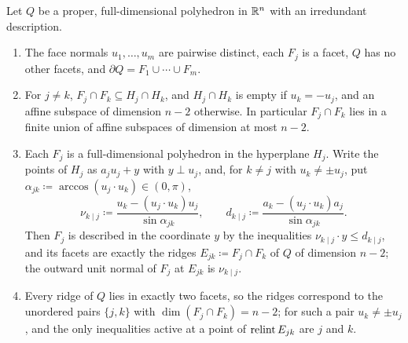 \begin{fact}\label{tb:facets}
Let \(Q\) be a proper, full-dimensional polyhedron in \(\mathbb R^n\) with an
irredundant description.
\begin{enumerate}
\item[(a)] The face normals \(u_1,\ldots,u_m\) are pairwise distinct, each
\(F_j\) is a facet, \(Q\) has no other facets, and
\(\partial Q=F_1\cup\cdots\cup F_m\).
\item[(b)] For \(j\ne k\), \(F_j\cap F_k\subseteq H_j\cap H_k\), and
\(H_j\cap H_k\) is empty if \(u_k=-u_j\), and an affine subspace of
dimension \(n-2\) otherwise. In particular \(F_j\cap F_k\) lies in a
finite union of affine subspaces of dimension at most \(n-2\).
\item[(c)] Each \(F_j\) is a full-dimensional polyhedron in the hyperplane
\(H_j\). Write the points of \(H_j\) as \(a_ju_j+y\) with \(y\perp u_j\), and,
for \(k\ne j\) with \(u_k\ne\pm u_j\), put
\(\alpha_{jk}\coloneqq \arccos(u_j\cdot u_k)\in(0,\pi)\),
\[
 \nu_{k\mid j}\coloneqq \frac{u_k-(u_j\cdot u_k)u_j}{\sin\alpha_{jk}},\qquad
 d_{k\mid j}\coloneqq \frac{a_k-(u_j\cdot u_k)a_j}{\sin\alpha_{jk}} .
\]
Then \(F_j\) is described in the coordinate \(y\) by the inequalities
\(\nu_{k\mid j}\cdot y\le d_{k\mid j}\), and its facets are exactly the
ridges \(E_{jk}\coloneqq F_j\cap F_k\) of \(Q\) of dimension \(n-2\); the outward
unit normal of \(F_j\) at \(E_{jk}\) is \(\nu_{k\mid j}\).
\item[(d)] Every ridge of \(Q\) lies in exactly two facets, so the ridges
correspond to the unordered pairs \(\{j,k\}\) with
\(\dim(F_j\cap F_k)=n-2\); for such a pair \(u_k\ne\pm u_j\), and the
only inequalities active at a point of \(\operatorname{relint} E_{jk}\) are \(j\) and \(k\).
\end{enumerate}
\end{fact}

